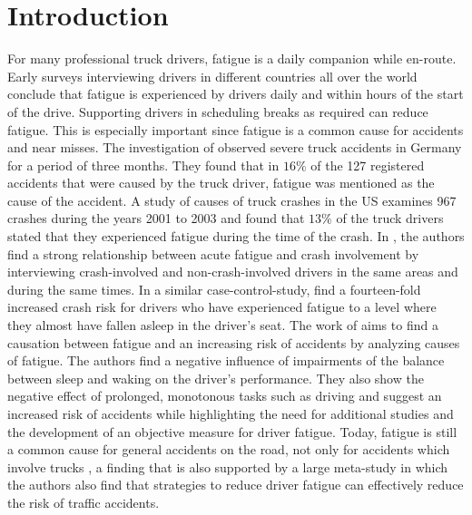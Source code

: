 
\chapter{Introduction\label{ch:introduction}}

For many professional truck drivers, fatigue is a daily companion while en-route. Early surveys \cite{williamson:2001, adams-guppy:2003} interviewing drivers in different countries all over the world conclude that fatigue is experienced by drivers daily and within hours of the start of the drive. Supporting drivers in scheduling breaks as required can reduce fatigue. This is especially important since fatigue is a common cause for accidents and near misses. The investigation of \cite{evers:2005} observed severe truck accidents in Germany for a period of three months. They found that in $16\%$ of the 127 registered accidents that were caused by the truck driver, fatigue was mentioned as the cause of the accident. A study of causes of truck crashes in the US \cite{federalmotorcarriersafetyadministrationfmcsa:2006} examines 967 crashes during the years 2001 to 2003 and found that $13\%$ of the truck drivers stated that they experienced fatigue during the time of the crash. In \cite{connor:2001}, the authors find a strong relationship between acute fatigue and crash involvement by interviewing crash-involved and non-crash-involved drivers in the same areas and during the same times. In a similar case-control-study, \cite{cummings:2001} find a fourteen-fold increased crash risk for drivers who have experienced fatigue to a level where they almost have fallen asleep in the driver's seat. The work of \cite{williamson:2011a} aims to find a causation between fatigue and an increasing risk of accidents by analyzing causes of fatigue. The authors find a negative influence of impairments of the balance between sleep and waking on the driver's performance. They also show the negative effect of prolonged, monotonous tasks such as driving and suggest an increased risk of accidents while highlighting the need for additional studies and the development of an objective measure for driver fatigue. Today, fatigue is still a common cause for general accidents on the road, not only for accidents which involve trucks \cite{statistischesbundesamtdestatis:2021}, a finding that is also supported by a large meta-study \cite{moradi:2019} in which the authors also find that strategies to reduce driver fatigue can effectively reduce the risk of traffic accidents.

